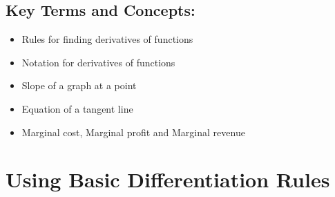 \begin{framed}
\subsection*{Key Terms and Concepts:} 

\begin{multicols}{2}
\begin{itemize}
    \item Rules for finding derivatives of functions
    \item Notation for derivatives of functions
    \item Slope of a graph at a point
    \item Equation of a tangent line
    \item Marginal cost, Marginal profit and Marginal revenue
\end{itemize}
\end{multicols}
\end{framed}

\newpage

\section*{Using Basic Differentiation Rules}



